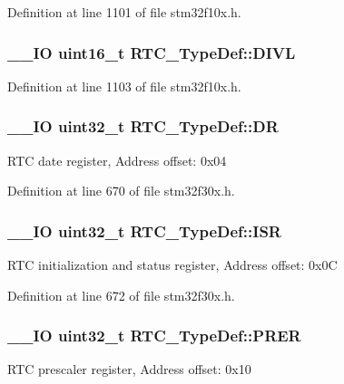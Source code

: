 Definition at line 1101 of file stm32f10x.\-h.

\hypertarget{struct_r_t_c___type_def_ad0c75a7cc4e925da0faedcd8860cb43a}{
\subsubsection[{D\-I\-V\-L}]{\setlength{\rightskip}{0pt plus 5cm}\-\_\-\-\_\-\-I\-O {\bf uint16\-\_\-t} R\-T\-C\-\_\-\-Type\-Def\-::\-D\-I\-V\-L}}\label{struct_r_t_c___type_def_ad0c75a7cc4e925da0faedcd8860cb43a}


Definition at line 1103 of file stm32f10x.\-h.

\hypertarget{struct_r_t_c___type_def_a8750eae683cb3d382476dc7cdcd92b96}{
\subsubsection[{D\-R}]{\setlength{\rightskip}{0pt plus 5cm}\-\_\-\-\_\-\-I\-O {\bf uint32\-\_\-t} R\-T\-C\-\_\-\-Type\-Def\-::\-D\-R}}\label{struct_r_t_c___type_def_a8750eae683cb3d382476dc7cdcd92b96}
R\-T\-C date register, Address offset\-: 0x04 

Definition at line 670 of file stm32f30x.\-h.

\hypertarget{struct_r_t_c___type_def_a5a7b104d80b48b5708b50cdc487d6a78}{
\subsubsection[{I\-S\-R}]{\setlength{\rightskip}{0pt plus 5cm}\-\_\-\-\_\-\-I\-O {\bf uint32\-\_\-t} R\-T\-C\-\_\-\-Type\-Def\-::\-I\-S\-R}}\label{struct_r_t_c___type_def_a5a7b104d80b48b5708b50cdc487d6a78}
R\-T\-C initialization and status register, Address offset\-: 0x0\-C 

Definition at line 672 of file stm32f30x.\-h.

\hypertarget{struct_r_t_c___type_def_a5f43a11e0873212f598e41db5f2dcf6a}{
\subsubsection[{P\-R\-E\-R}]{\setlength{\rightskip}{0pt plus 5cm}\-\_\-\-\_\-\-I\-O {\bf uint32\-\_\-t} R\-T\-C\-\_\-\-Type\-Def\-::\-P\-R\-E\-R}}\label{struct_r_t_c___type_def_a5f43a11e0873212f598e41db5f2dcf6a}
R\-T\-C prescaler register, Address offset\-: 0x10 

